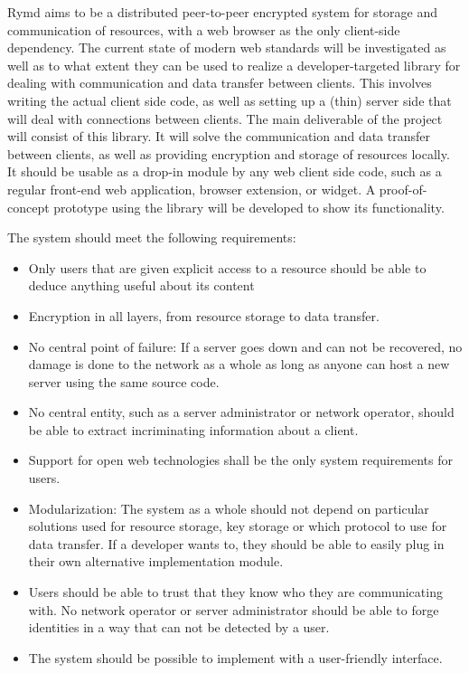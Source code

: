 Rymd aims to be a distributed peer-to-peer encrypted system for storage and communication of resources, with a web browser as the only client-side dependency. The current state of modern web standards will be investigated as well as to what extent they can be used to realize a developer-targeted library for dealing with communication and data transfer between clients. This involves writing the actual client side code, as well as setting up a (thin) server side that will deal with connections between clients.
The main deliverable of the project will consist of this library. It will solve the communication and data transfer between clients, as well as providing encryption and storage of resources locally. It should be usable as a drop-in module by any web client side code, such as a regular front-end web application, browser extension, or widget. A proof-of-concept prototype using the library will be developed to show its functionality.

The system should meet the following requirements:
\begin{itemize}
  \item Only users that are given explicit access to a resource should be able to deduce anything useful about its content
  
  
  \item Encryption in all layers, from resource storage to data transfer.
  
  \item No central point of failure: If a server goes down and can not be recovered, no damage is done to the network as a whole as long as anyone can host a new server using the same source code.
  
  \item No central entity, such as a server administrator or network operator, should be able to extract incriminating information about a client.
  
  \item Support for open web technologies shall be the only system requirements for users.

  
  \item Modularization: The system as a whole should not depend on particular solutions used for resource storage, key storage or which protocol to use for data transfer. If a developer wants to, they should be able to easily plug in their own alternative implementation module.

\item Users should be able to trust that they know who they are communicating with. No network operator or server administrator should be able to forge identities in a way that can not be detected by a user.

\item The system should be possible to implement with a user-friendly interface.

\end{itemize}